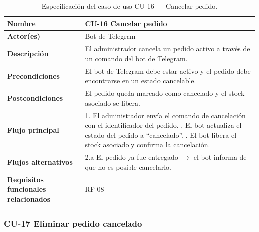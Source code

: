 \begin{table}[H]
\centering
\small
\begin{tabular}{|m{}|m{}|}
\hline
\textbf{Nombre} & CU-16 Cancelar pedido \\ \hline
\textbf{Actor(es)} & Bot de Telegram \\ \hline
\textbf{Descripción} & El administrador cancela un pedido activo a través de un comando del bot de Telegram. \\ \hline
\textbf{Precondiciones} & El bot de Telegram debe estar activo y el pedido debe encontrarse en un estado cancelable. \\ \hline
\textbf{Postcondiciones} & El pedido queda marcado como cancelado y el stock asociado se libera. \\ \hline
\textbf{Flujo principal} & 1. El administrador envía el comando de cancelación con el identificador del pedido. \newline 2. El bot actualiza el estado del pedido a ``cancelado''. \newline 3. El bot libera el stock asociado y confirma la cancelación. \\ \hline
\textbf{Flujos alternativos} & 2.a El pedido ya fue entregado $\rightarrow$ el bot informa de que no es posible cancelarlo. \\ \hline
\textbf{Requisitos funcionales relacionados} & RF-08 \\ \hline
\end{tabular}
\caption{Especificación del caso de uso CU-16 — Cancelar pedido.}
\end{table}

\subsubsection{CU-17 Eliminar pedido cancelado}

